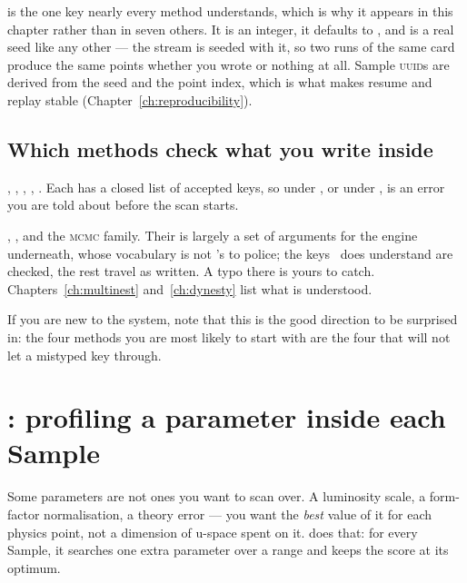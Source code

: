  is the one  key nearly every method understands, which
is why it appears in this chapter rather than in seven others. It is an integer, it
defaults to , and  is a real seed like any other --- the stream is
seeded with it, so two runs of the same card produce the same points whether you wrote
 or nothing at all. Sample \textsc{uuid}s are derived from the seed and
the point index, which is what makes resume and replay stable
(Chapter~\ref{ch:reproducibility}).

\subsection*{Which methods check what you write inside}

\begin{keylist}
  \item[Checked, strictly] , , ,
        , . Each has a closed list of accepted
        keys, so  under , or  under
        , is an error you are told about before the scan starts.
  \item[Passed through] , , and the \textsc{mcmc}
        family. Their  is largely a set of arguments for the engine
        underneath, whose vocabulary is not \Jtwo's to police; the keys \Jtwo\ does
        understand are checked, the rest travel as written. A typo there is yours to
        catch. Chapters~\ref{ch:multinest} and~\ref{ch:dynesty} list what is understood.
\end{keylist}

If you are new to the system, note that this is the good direction to be surprised in:
the four methods you are most likely to start with are the four that will not let a
mistyped key through.


\section{: profiling a parameter inside each Sample}
\label{sec:nuisance}

Some parameters are not ones you want to scan over. A luminosity scale, a form-factor
normalisation, a theory error --- you want the \emph{best} value of it for each physics
point, not a dimension of u-space spent on it.  does that: for every
Sample, it searches one extra parameter over a range and keeps the score at its optimum.

